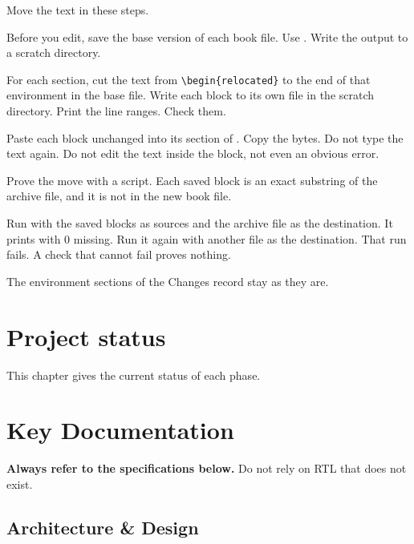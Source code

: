Move the text in these steps.
\begin{procedure}
  \item Before you edit, save the base version of each book file. Use . Write the output to a scratch directory.
  \item For each section, cut the text from \texttt{\textbackslash begin\{relocated\}} to the end of that environment in the base file. Write each block to its own file in the scratch directory. Print the line ranges. Check them.
  \item Paste each block unchanged into its section of . Copy the bytes. Do not type the text again. Do not edit the text inside the block, not even an obvious error.
  \item Prove the move with a script. Each saved block is an exact substring of the archive file, and it is not in the new book file.
  \item Run  with the saved blocks as sources and the archive file as the destination. It prints  with 0 missing. Run it again with another file as the destination. That run fails. A check that cannot fail proves nothing.
\end{procedure}
The environment  sections of the Changes record stay as they are.

\chapter{Project status}\label{um:ch:project-status}

This chapter gives the current status of each phase.

\chapter{Key Documentation}\label{um:guide:key-documentation}

\textbf{Always refer to the specifications below.}
Do not rely on RTL that does not exist.

\section{Architecture \& Design}\label{um:guide:key-documentation:architecture-design}

